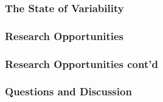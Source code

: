 \documentclass{beamer}
\begin{document}
\begin{frame}\frametitle{\textbf{\LARGE{\textrm{The State of Variability}}}}
\end{frame}

\begin{frame}\frametitle{\textbf{\LARGE{\textrm{Research Opportunities}}}}
\end{frame}

\begin{frame}\frametitle{\textbf{\LARGE{\textrm{Research Opportunities cont'd}}}}
\end{frame}

\begin{frame}\frametitle{\textbf{\LARGE{\textrm{Questions and Discussion}}}}
\end{frame}
\end{document}
